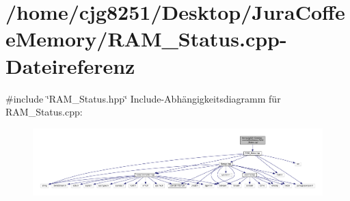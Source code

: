 \section{/home/cjg8251/\+Desktop/\+Jura\+Coffee\+Memory/\+R\+A\+M\+\_\+\+Status.cpp-\/\+Dateireferenz}
\label{_r_a_m___status_8cpp}
{\ttfamily \#include \char`\"{}R\+A\+M\+\_\+\+Status.\+hpp\char`\"{}}\newline
Include-\/\+Abhängigkeitsdiagramm für R\+A\+M\+\_\+\+Status.\+cpp\+:
\nopagebreak
\begin{figure}[H]
\begin{center}
\leavevmode
\includegraphics[width=350pt]{_r_a_m___status_8cpp__incl}
\end{center}
\end{figure}
